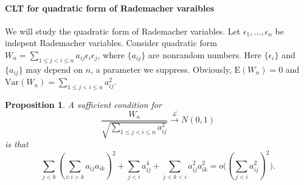 \documentclass[review]{elsarticle}
\theoremstyle{plain}
\newtheorem{proposition}{\quad\quad Proposition}
\theoremstyle{definition}
\theoremstyle{remark}
\begin{document}
\paragraph{CLT for quadratic form of Rademacher varaibles}
We will study the quadratic form of Rademacher variables.
 Let $\epsilon_1,\ldots,\epsilon_n$ be indepent Rademacher  variables. 
 Consider quadratic form $W_n=\sum_{1\leq j<i\leq n} a_{ij}\epsilon_i \epsilon_j$, where $\{a_{ij}\}$ are nonrandom numbers. Here $\{\epsilon_i\}$ and $\{a_{ij}\}$ may depend on $n$, a parameter we suppress.
 Obviously, $\mathrm{E}(W_n)=0$ and $\mathrm{Var}(W_n)=\sum_{1\leq j<i\leq n} a_{ij}^2$.

 \begin{proposition}\label{CLTprop}
     A sufficient condition for
     \begin{equation}
         \frac{W_n}{\sqrt{\sum_{1\leq j<i\leq n} a_{ij}^2}}\xrightarrow{\mathcal{L}} N(0,1)
     \end{equation}
     is that
     \begin{equation}
         \sum_{j<k}{(\sum_{i:i>k}a_{ij}a_{ik})}^2+
         \sum_{j<i}a_{ij}^4+
         \sum_{j<k<i}a_{ij}^2 a_{ik}^2
         =o\big({(\sum_{j<i} a_{ij}^2)}^2\big).
     \end{equation}
 \end{proposition}
\end{document}
